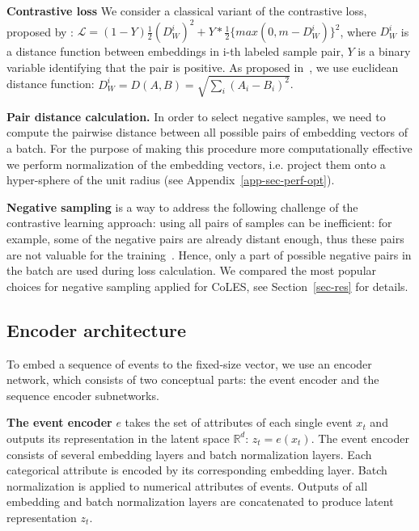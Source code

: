 \documentclass{article}
\newcommand{\R}{\mathbb{R}}
\begin{document}
\textbf{Contrastive loss} We consider a classical variant of the contrastive loss, proposed by \citep{Hadsell2006DimensionalityRB}: %
$ \mathcal{L} =  (1-Y)\frac{1}{2}(D_W^i)^2 +Y*\frac{1}{2}\{max(0,m-D_W^i)\}^2 $, where $D_W^i$ is a distance function between embeddings in i-th labeled sample pair, $Y$ is a binary variable identifying that the pair is positive.
As proposed in~\citep{Hadsell2006DimensionalityRB}, we use euclidean distance function: $D_W^i = D(A,B) = \sqrt{\sum_i(A_i - B_i)^2}$.

\textbf{Pair distance calculation.} In order to select negative samples, we need to compute the pairwise distance between all possible pairs of embedding vectors of a batch. For the purpose of making this procedure more computationally effective we perform normalization of the embedding vectors, i.e. project them onto a hyper-sphere of the unit radius (see Appendix~\ref{app-sec-perf-opt}).


\textbf{Negative sampling} is a way to address the following challenge of the contrastive learning approach: using all pairs of samples can be inefficient: for example, some of the negative pairs are already distant enough, thus these pairs are not valuable for the training~\citep{SimoSerra2015DiscriminativeLO, Schroff2015FaceNetAU}. Hence, only a part of possible negative pairs in the batch are used during loss calculation. We compared the most popular choices for negative sampling applied for CoLES, see Section~\ref{sec-res} for details.

\subsection{Encoder architecture} \label{sec-enc-arch}

To embed a sequence of events to the fixed-size vector, we use an encoder network, which consists of two conceptual parts: the event encoder and the sequence encoder subnetworks.

\textbf{The event encoder} $e$ takes the set of attributes of each single event $x_t$ and outputs its representation in the latent space $\R^d$: $z_t = e(x_t)$. The event encoder consists of several embedding layers and batch normalization layers. Each categorical attribute is encoded by its corresponding embedding layer. Batch normalization is applied to numerical attributes of events. Outputs of all embedding and batch normalization layers are concatenated to produce latent representation $z_t$.
\end{document}
